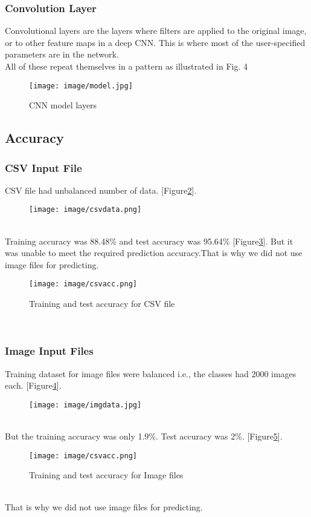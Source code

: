 \documentclass[conference]{IEEEtran}
\begin{document}
\subsubsection{Convolution Layer}
Convolutional layers are the layers where filters are applied to the original image, or to other feature maps in a deep CNN. This is where most of the user-specified parameters are in the network.\\
All of these repeat themselves in a pattern as illustrated in Fig. 4
\begin{figure}[htp]
    \centering
    \texttt{[image: image/model.jpg]}
    \caption{CNN model layers}
    \label{model}
\end{figure}
\subsection{Accuracy}
\subsubsection{CSV Input File}
CSV file had unbalanced number of data.
[Figure\ref{csvdataa}].
\begin{figure}[htp]
    \centering
    \texttt{[image: image/csvdata.png]}
    \caption{ }
    \label{csvdataa}
\end{figure}\\
Training accuracy was 88.48\% and test accuracy was 95.64\% [Figure\ref{csvacc}].
But it was unable to meet the required prediction accuracy.That is why we did not use image files for predicting.
\begin{figure}[htp]
    \centering
    \texttt{[image: image/csvacc.png]}
    \caption{Training and test accuracy for CSV file}
    \label{csvacc}
\end{figure}\\
\subsubsection{Image Input Files}
Training dataset for image files were balanced i.e., the classes had 2000 images each. [Figure\ref{imgdataa}].
\begin{figure}[htp]
    \centering
    \texttt{[image: image/imgdata.jpg]}
    \caption{ }
    \label{imgdataa}
\end{figure}\\
But the training accuracy was only 1.9\%. Test accuracy was 2\%.
[Figure\ref{imgacc}].
\begin{figure}[htp]
    \centering
    \texttt{[image: image/csvacc.png]}
    \caption{Training and test accuracy for Image files}
    \label{imgacc}
\end{figure}\\
That is why we did not use image files for predicting.\\
\end{document}
